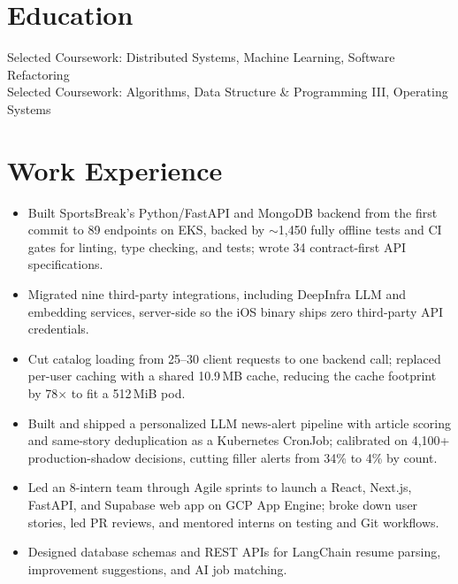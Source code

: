 \documentclass[11pt, letterpaper]{article}
\begin{document}

\section{Education}
Selected Coursework: Distributed Systems, Machine Learning, Software Refactoring\\[1pt]
Selected Coursework: Algorithms, Data Structure \& Programming III, Operating Systems

\section{Work Experience}
\begin{itemize}
  \item Built SportsBreak's Python/FastAPI and MongoDB backend from the first commit to 89 endpoints on EKS, backed by $\sim$1{,}450 fully offline tests and CI gates for linting, type checking, and tests; wrote 34 contract-first API specifications.
  \item Migrated nine third-party integrations, including DeepInfra LLM and embedding services, server-side so the iOS binary ships zero third-party API credentials.
  \item Cut catalog loading from 25--30 client requests to one backend call; replaced per-user caching with a shared 10.9\,MB cache, reducing the cache footprint by 78$\times$ to fit a 512\,MiB pod.
  \item Built and shipped a personalized LLM news-alert pipeline with article scoring and same-story deduplication as a Kubernetes CronJob; calibrated on 4{,}100+ production-shadow decisions, cutting filler alerts from 34\% to 4\% by count.
\end{itemize}

\begin{itemize}
  \item Led an 8-intern team through Agile sprints to launch a React, Next.js, FastAPI, and Supabase web app on GCP App Engine; broke down user stories, led PR reviews, and mentored interns on testing and Git workflows.
  \item Designed database schemas and REST APIs for LangChain resume parsing, improvement suggestions, and AI job matching.
\end{itemize}
\end{document}
